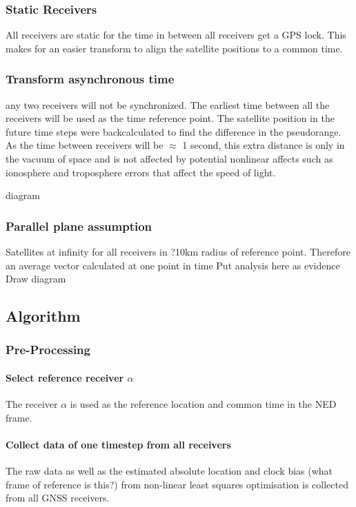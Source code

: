 \documentclass[11pt,a4paper]{article}
\begin{document}
\subsubsection{Static Receivers}
All receivers are static for the time in between all receivers get a GPS lock. This makes for an easier transform to align the satellite positions to a common time.

\subsubsection{Transform asynchronous time}
any two receivers will not be synchronized. The earliest time between all the receivers will be used as the time reference point. The satellite position in the future time steps were backcalculated to find the difference in the pseudorange. As the time between receivers will be $\approx$ 1 second, this extra distance is only in the vacuum of space and is not affected by potential nonlinear affects such as ionosphere and troposphere errors that affect the speed of light.

diagram

\subsubsection{Parallel plane assumption}
Satellites at infinity for all receivers in ?10km radius of reference point. Therefore an average vector calculated at one point in time  
Put analysis here as evidence
Draw diagram



\subsection{Algorithm}

\subsubsection{Pre-Processing}
\paragraph{Select reference receiver $\alpha$}
The receiver $\alpha$ is used as the reference location and common time in the NED frame. 
\paragraph{Collect data of one timestep from all receivers}
The raw data as well as the estimated absolute location and clock bias (what frame of reference is this?) from non-linear least squares optimisation is collected from all GNSS receivers.
\end{document}
